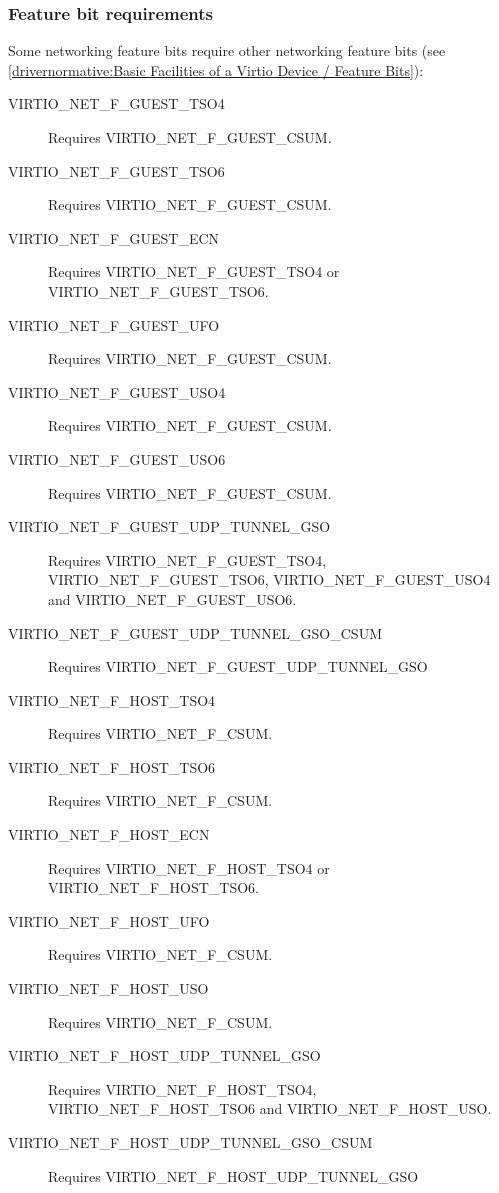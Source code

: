 \subsubsection{Feature bit requirements}\label{sec:Device Types / Network Device / Feature bits / Feature bit requirements}

Some networking feature bits require other networking feature bits
(see \ref{drivernormative:Basic Facilities of a Virtio Device / Feature Bits}):

\begin{description}
\item[VIRTIO_NET_F_GUEST_TSO4] Requires VIRTIO_NET_F_GUEST_CSUM.
\item[VIRTIO_NET_F_GUEST_TSO6] Requires VIRTIO_NET_F_GUEST_CSUM.
\item[VIRTIO_NET_F_GUEST_ECN] Requires VIRTIO_NET_F_GUEST_TSO4 or VIRTIO_NET_F_GUEST_TSO6.
\item[VIRTIO_NET_F_GUEST_UFO] Requires VIRTIO_NET_F_GUEST_CSUM.
\item[VIRTIO_NET_F_GUEST_USO4] Requires VIRTIO_NET_F_GUEST_CSUM.
\item[VIRTIO_NET_F_GUEST_USO6] Requires VIRTIO_NET_F_GUEST_CSUM.
\item[VIRTIO_NET_F_GUEST_UDP_TUNNEL_GSO] Requires VIRTIO_NET_F_GUEST_TSO4, VIRTIO_NET_F_GUEST_TSO6,
   VIRTIO_NET_F_GUEST_USO4 and VIRTIO_NET_F_GUEST_USO6.
\item[VIRTIO_NET_F_GUEST_UDP_TUNNEL_GSO_CSUM] Requires VIRTIO_NET_F_GUEST_UDP_TUNNEL_GSO

\item[VIRTIO_NET_F_HOST_TSO4] Requires VIRTIO_NET_F_CSUM.
\item[VIRTIO_NET_F_HOST_TSO6] Requires VIRTIO_NET_F_CSUM.
\item[VIRTIO_NET_F_HOST_ECN] Requires VIRTIO_NET_F_HOST_TSO4 or VIRTIO_NET_F_HOST_TSO6.
\item[VIRTIO_NET_F_HOST_UFO] Requires VIRTIO_NET_F_CSUM.
\item[VIRTIO_NET_F_HOST_USO] Requires VIRTIO_NET_F_CSUM.
\item[VIRTIO_NET_F_HOST_UDP_TUNNEL_GSO] Requires VIRTIO_NET_F_HOST_TSO4, VIRTIO_NET_F_HOST_TSO6
   and VIRTIO_NET_F_HOST_USO.
\item[VIRTIO_NET_F_HOST_UDP_TUNNEL_GSO_CSUM] Requires VIRTIO_NET_F_HOST_UDP_TUNNEL_GSO


\end{description}
